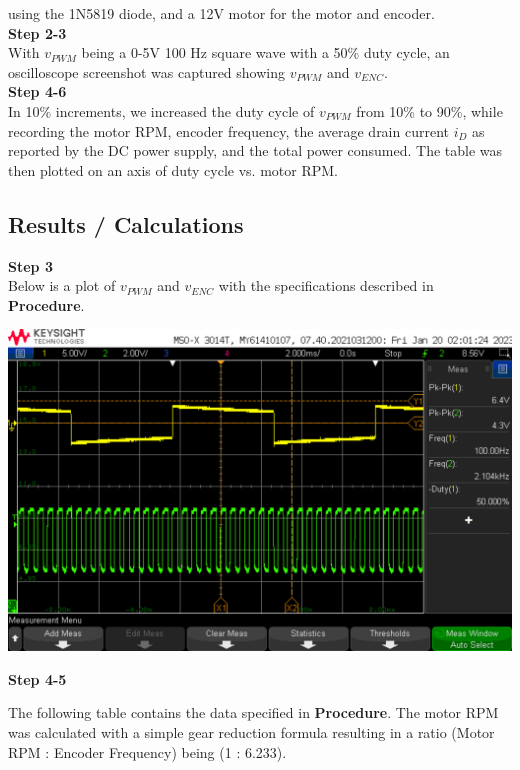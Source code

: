 \documentclass[notitlepage, 12pt]{report}  %
\begin{document}
using the 1N5819 diode, and a 12V motor for the motor and encoder.\\

\textbf{Step 2-3}\\
With $v_{PWM}$ being a 0-5V 100 Hz square wave with a 50\% duty cycle, an oscilloscope screenshot was captured
showing $v_{PWM}$ and $v_{ENC}$. \\

\textbf{Step 4-6}\\
In 10\% increments, we increased the duty cycle of $v_{PWM}$ from 10\% to 90\%, while recording the motor RPM, encoder
frequency, the average drain current $i_D$ as reported by the DC power supply, and the total power consumed. The table
was then plotted on an axis of duty cycle vs. motor RPM.\\

\newpage

\subsection*{Results / Calculations}
\indent\indent \textbf{Step 3}\\
Below is a plot of $v_{PWM}$ and $v_{ENC}$ with the specifications described in \textbf{Procedure}. 

\begin{center}
    \includegraphics[scale=0.2]{t2s3.png}
\end{center}

\textbf{Step 4-5}

The following table contains the data specified in \textbf{Procedure}. The motor RPM was calculated with a simple gear reduction formula resulting 
in a ratio (Motor RPM : Encoder Frequency) being (1 : 6.233). 
\end{document}
